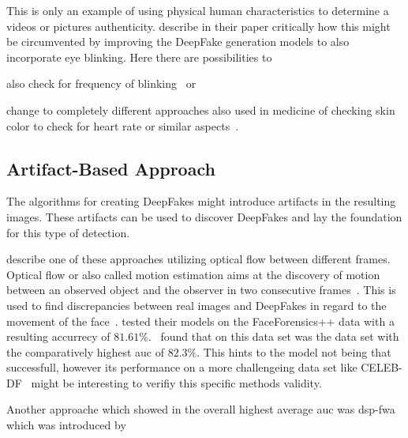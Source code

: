 \par
This is only an example of using physical human characteristics to determine a
videos or pictures authenticity. \textcite{li_ictu_2018} describe in 
their paper critically how this might be circumvented by improving the DeepFake
generation models to also incorporate eye blinking. Here there are possibilities
to 
\begin{enumerate*}[a.)]
    \item also check for frequency of blinking~\cite{li_ictu_2018} or
    \item change to completely different approaches also used in medicine of
    checking skin color to check for heart rate or similar aspects~\cite{pishori_detecting_2020}.
\end{enumerate*}

\subsection{Artifact-Based Approach}
The algorithms for creating DeepFakes might introduce artifacts in the resulting
images. These artifacts can be used to discover DeepFakes and lay the foundation
for this type of detection.

\par
\textcite{amerini_deepfake_2019} describe one of these approaches utilizing optical
flow between different frames.
Optical flow or also called motion estimation aims at the discovery of motion
between an observed object and the observer in two consecutive frames~\cite{beauchemin_computation_1995}.
This is used to find discrepancies between real images and DeepFakes in regard
to the movement of the face~\cite{amerini_deepfake_2019}.
\textcite{amerini_deepfake_2019} tested their models on the FaceForensics++ data
with a resulting accurrecy of \(81.61\%\).~\textcite{li_celeb-df_2019} found that
on this data set was the data set with the comparatively highest \gls{auc} of 
\(82.3\%\). This hints to the model not being that successfull, however its
performance on a more challengeing data set like CELEB-DF~\cite{li_celeb-df_2019}
might be interesting to verifiy this specific methods validity.

\par
Another approache which showed in \cite{li_celeb-df_2019} the overall highest
average \gls{auc} was \gls{dsp-fwa} which was introduced by \cite{he_spatial_2014}

